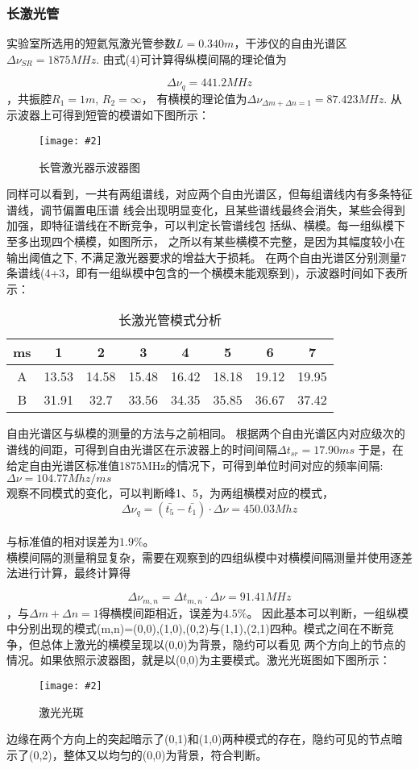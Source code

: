 \documentclass[12pt,a4paper]{article}
\newcommand{\be}[1]{
    \begin{equation}
        #1
    \end{equation}
}
\newcommand{\bfig}[3]{
    \begin{figure}[H]
        \centering
        \texttt{[image: \#2]}
        \caption{#3}
    \end{figure}
}
\begin{document}
\subsubsection{长激光管}
实验室所选用的短氦氖激光管参数$L=0.340m$，干涉仪的自由光谱区$\Delta \nu_{SR}=1875MHz$. 由式(4)可计算得纵模间隔的理论值为
\be{\Delta \nu_q=441.2MHz}，共振腔$R_1=1m$, $R_2=\infty$， 有横模的理论值为$\Delta \nu_{\Delta m+\Delta n=1}=87.423MHz$.
从示波器上可得到短管的模谱如下图所示：
\bfig{0.6}{长管激光器示意图.jpeg}{长管激光器示波器图}
同样可以看到，一共有两组谱线，对应两个自由光谱区，但每组谱线内有多条特征谱线，调节偏置电压谱
线会出现明显变化，且某些谱线最终会消失，某些会得到加强，即特征谱线在不断竞争，可以判定长管谱线包
括纵、横模。每一组纵模下至多出现四个横模，如图所示，
之所以有某些横模不完整，是因为其幅度较小在输出阈值之下, 不满足激光器要求的增益大于损耗。
在两个自由光谱区分别测量7条谱线(4+3，即有一组纵模中包含的一个横模未能观察到)，示波器时间如下表所示：
\\
\begin{table}[H]
    \centering
    \caption{长激光管模式分析}
    \begin{tabular}{|c|c|c|c|c|c|c|c|}
    \hline
     ms & 1     & 2     & 3     & 4     & 5    & 6     & 7     \\ \hline
    A & 13.53 &14.58    &15.48  &16.42  &18.18  &19.12  &19.95 \\ \hline
    B & 31.91 &32.7     &33.56  &34.35  &35.85  &36.67  &37.42 \\ \hline
    \end{tabular}
    \end{table}
自由光谱区与纵模的测量的方法与之前相同。
根据两个自由光谱区内对应级次的谱线的间距，可得到自由光谱区在示波器上的时间间隔$\Delta t_{sr} = 17.90 \unit{ms}$
于是，在给定自由光谱区标准值1875MHz的情况下，可得到单位时间对应的频率间隔:$\Delta \nu =104.77 \unit{Mhz \per ms}$\\
观察不同模式的变化，可以判断峰1、5，为两组横模对应的模式，\be{\Delta \nu_q=(\bar{t_5}-\bar{t_1})\cdot \Delta \nu=450.03 \unit{Mhz}}\\
与标准值的相对误差为$1.9\%$。\\
横模间隔的测量稍显复杂，需要在观察到的四组纵模中对横模间隔测量并使用逐差法进行计算，最终计算得
\be{\Delta \nu_{m,n}=\Delta t_{m,n} \cdot \Delta \nu=91.41MHz}，与$\Delta m+\Delta n=1$得横模间距相近，误差为$4.5\%$。
因此基本可以判断，一组纵模中分别出现的模式(m,n)=(0,0),(1,0),(0,2)与(1,1),(2,1)四种。模式之间在不断竞争，但总体上激光的横模呈现以(0,0)为背景，隐约可以看见
两个方向上的节点的情况。如果依照示波器图，就是以(0,0)为主要模式。激光光斑图如下图所示：
\bfig{0.5}{激光光斑.jpg}{激光光斑}
边缘在两个方向上的突起暗示了(0,1)和(1,0)两种模式的存在，隐约可见的节点暗示了(0,2)，整体又以均匀的(0,0)为背景，符合判断。
\end{document}
